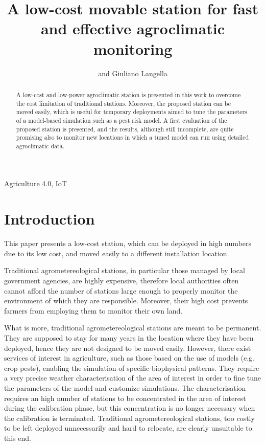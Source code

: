 \documentclass[conference]{IEEEtran}
\title{A low-cost movable station for fast and effective agroclimatic monitoring}
\author{
    \IEEEauthorblockN{Raffaele Martino\IEEEauthorrefmark{1}, Massimo Nicolazzo\IEEEauthorrefmark{1}} and Giuliano Langella\IEEEauthorrefmark{2}
    \IEEEauthorblockA{\IEEEauthorrefmark{1}Department of Electrical Engineering and Information Technology, University of Naples Federico II, Naples, NA, Italy}
    \IEEEauthorblockA{\IEEEauthorrefmark{2}Department of Agriculture, University of Naples Federico II, Portici, NA, Italy}
}
\begin{document}
\maketitle

\begin{abstract}
A low-cost and low-power agroclimatic station is presented in this work to overcome the cost limitation of traditional stations.
Moreover, the proposed station can be moved easily, which is useful for temporary deployments aimed to tune the parameters of a model-based simulation such as a pest risk model.
A first evaluation of the proposed station is presented, and the results, although still incomplete, are quite promising also to monitor new locations in which a tuned model can run using detailed agroclimatic data.
\end{abstract}

\begin{IEEEkeywords}
    Agriculture 4.0, IoT
\end{IEEEkeywords}

\section{Introduction}

This paper presents a low-cost station, which can be deployed in high numbers due to its low cost, and moved easily to a different installation location.

Traditional agrometereological stations, in particular those managed by local government agencies, are highly expensive, therefore local authorities often cannot afford the number of stations large enough to properly monitor the environment of which they are responsible. Moreover, their high cost prevents farmers from employing them to monitor their own land.

What is more, traditional agrometereological stations are meant to be permanent.
They are supposed to stay for many years in the location where they have been deployed, hence they are not designed to be moved easily.
However, there exist services of interest in agriculture, such as those based on the use of models (e.g. crop pests), enabling the simulation of specific biophysical patterns.
They require a very precise weather characterisation of the area of interest in order to fine tune the parameters of the model and customize simulations.
The characterisation requires an high number of stations to be concentrated in the area of interest during the calibration phase, but this concentration is no longer necessary when the calibration is terminated.
Traditional agrometereological stations, too costly to be left deployed unnecessarily and hard to relocate, are clearly unsuitable to this end.
\end{document}
